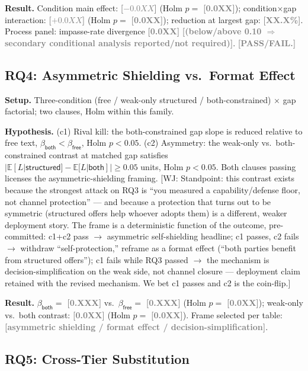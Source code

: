 \documentclass[conference]{IEEEtran}
\newcommand{\ph}[1]{\textcolor{Gray}{\textbf{[#1]}}}
\newcommand{\wj}[1]{\textcolor{RedOrange}{\footnotesize\textsf{[WJ: #1]}}}
\begin{document}
\textbf{Result.} Condition main effect: \ph{$-0.0XX$} (Holm $p = $ \ph{0.0XX}); condition$\times$gap interaction: \ph{$+0.0XX$} (Holm $p = $ \ph{0.0XX}); reduction at largest gap: \ph{XX.X\%}. Process panel: impasse-rate divergence \ph{0.0XX} \ph{(below/above 0.10 $\Rightarrow$ secondary conditional analysis reported/not required)}. \ph{PASS/FAIL.}

\subsection{RQ4: Asymmetric Shielding vs.\ Format Effect}
\label{sec:rq4}

\textbf{Setup.} Three-condition (\textsf{free} / weak-only \textsf{structured} / \textsf{both-constrained}) $\times$ gap factorial; two clauses, Holm within this family.

\textbf{Hypothesis.} (c1) Rival kill: the both-constrained gap slope is reduced relative to free text, $\beta_{\textsf{both}} < \beta_{\textsf{free}}$, Holm $p<0.05$. (c2) Asymmetry: the weak-only vs.\ both-constrained contrast at matched gap satisfies $|\mathbb{E}[L|\textsf{structured}] - \mathbb{E}[L|\textsf{both}]| \geq 0.05$ units, Holm $p<0.05$. Both clauses passing licenses the asymmetric-shielding framing. \wj{Standpoint: this contrast exists because the strongest attack on RQ3 is ``you measured a capability/defense floor, not channel protection'' --- and because a protection that turns out to be symmetric (structured offers help whoever adopts them) is a different, weaker deployment story. The frame is a deterministic function of the outcome, pre-committed: c1+c2 pass $\rightarrow$ asymmetric self-shielding headline; c1 passes, c2 fails $\rightarrow$ withdraw ``self-protection,'' reframe as a format effect (``both parties benefit from structured offers''); c1 fails while RQ3 passed $\rightarrow$ the mechanism is decision-simplification on the weak side, not channel closure --- deployment claim retained with the revised mechanism. We bet c1 passes and c2 is the coin-flip.}

\textbf{Result.} $\beta_{\textsf{both}} = $ \ph{0.XXX} vs.\ $\beta_{\textsf{free}} = $ \ph{0.XXX} (Holm $p = $ \ph{0.0XX}); weak-only vs.\ both contrast: \ph{0.0XX} (Holm $p = $ \ph{0.0XX}). Frame selected per table: \ph{asymmetric shielding / format effect / decision-simplification}.

\subsection{RQ5: Cross-Tier Substitution}
\label{sec:rq5}
\end{document}
